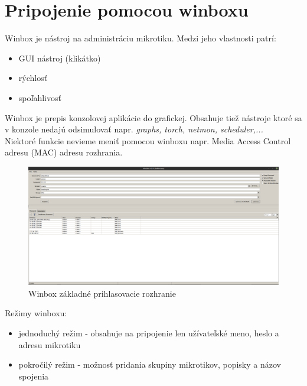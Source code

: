 \section{Pripojenie pomocou winboxu}
Winbox\cite{winbox} je nástroj na administráciu mikrotiku. Medzi jeho vlastnosti patrí:\begin{itemize}
\item GUI nástroj (klikátko)
\item rýchlosť
\item spoľahlivosť 
\end{itemize} 
Winbox je prepis konzolovej aplikácie do grafickej. Obsahuje tiež nástroje ktoré sa v konzole nedajú odsimulovať napr. \textit{graphs, torch, netmon, scheduler,...}\\
Niektoré funkcie nevieme meniť pomocou winboxu napr. Media Access Control adresu (MAC) adresu rozhrania. 
\begin{figure}[H]
\centering
\includegraphics[scale=0.2]{../text/winbox.png}
\caption{Winbox základné prihlasovacie rozhranie}
\label{fig:winbox}
\end{figure} 
Režimy winboxu:\begin{itemize}
\item jednoduchý režim - obsahuje na pripojenie len užívateľské meno, heslo a adresu mikrotiku
\item pokročilý režim - možnosť pridania skupiny mikrotikov, popisky a názov spojenia
\end{itemize}
